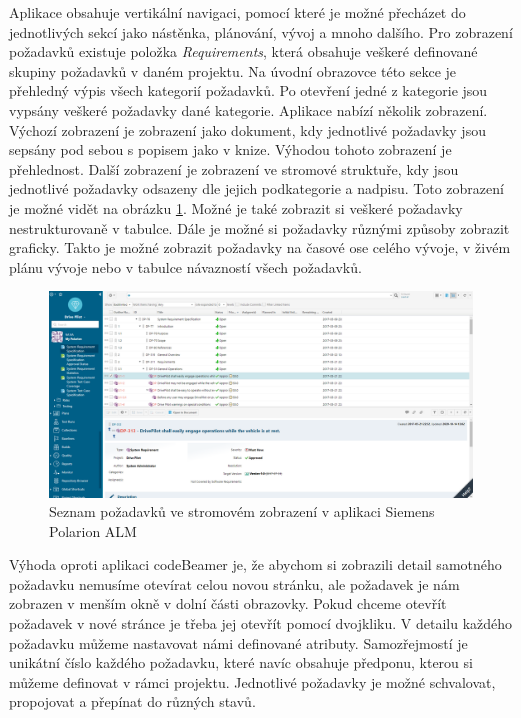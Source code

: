 \documentclass[czech,master,public,dept460,male,cpdeclaration,oneside]{diploma}
\begin{document}
Aplikace obsahuje vertikální navigaci, pomocí které je možné přecházet do jednotlivých sekcí jako nástěnka, plánování, vývoj a mnoho dalšího. Pro zobrazení požadavků existuje položka \textit{Requirements}, která obsahuje veškeré definované skupiny požadavků v daném projektu. Na úvodní obrazovce této sekce je přehledný výpis všech kategorií požadavků. Po otevření jedné z kategorie jsou vypsány veškeré požadavky dané kategorie. Aplikace nabízí několik zobrazení. Výchozí zobrazení je zobrazení jako dokument, kdy jednotlivé požadavky jsou sepsány pod sebou s popisem jako v knize. Výhodou tohoto zobrazení je přehlednost. Další zobrazení je zobrazení ve stromové struktuře, kdy jsou jednotlivé požadavky odsazeny dle jejich podkategorie a nadpisu. Toto zobrazení je možné vidět na obrázku \ref{fig:polarion_requirements}. Možné je také zobrazit si veškeré požadavky nestrukturovaně v tabulce. Dále je možné si požadavky různými způsoby zobrazit graficky. Takto je možné zobrazit požadavky na časové ose celého vývoje, v živém plánu vývoje nebo v tabulce návazností všech požadavků.

\begin{figure}[!ht]
    \centering
    \includegraphics[width=1\textwidth]{Diplomka/Figures/polarion_requirements.png}
    \caption{Seznam požadavků ve stromovém zobrazení v aplikaci Siemens Polarion ALM}
    \label{fig:polarion_requirements}
\end{figure}

Výhoda oproti aplikaci codeBeamer je, že abychom si zobrazili detail samotného požadavku nemusíme otevírat celou novou stránku, ale požadavek je nám zobrazen v menším okně v dolní části obrazovky. Pokud chceme otevřít požadavek v nové stránce je třeba jej otevřít pomocí dvojkliku. V detailu každého požadavku můžeme nastavovat námi definované atributy. Samozřejmostí je unikátní číslo každého požadavku, které navíc obsahuje předponu, kterou si můžeme definovat v rámci projektu. Jednotlivé požadavky je možné schvalovat, propojovat a přepínat do různých stavů.
\end{document}
